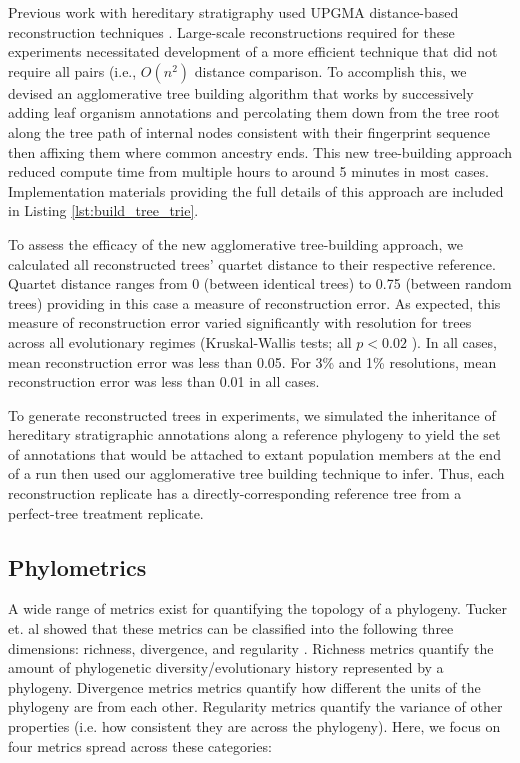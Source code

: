 Previous work with hereditary stratigraphy used UPGMA distance-based reconstruction techniques \citep{moreno2022hereditary}.
Large-scale reconstructions required for these experiments necessitated development of a more efficient technique that did not require all pairs (i.e., $O(n^2)$ distance comparison.
To accomplish this, we devised an agglomerative tree building algorithm that works by successively adding leaf organism annotations and percolating them down from the tree root along the tree path of internal nodes consistent with their fingerprint sequence then affixing them where common ancestry ends.
This new tree-building approach reduced compute time from multiple hours to around 5 minutes in most cases. 
Implementation materials providing the full details of this approach are included in Listing \ref{lst:build_tree_trie}.

To assess the efficacy of the new agglomerative tree-building approach, we calculated all reconstructed trees' quartet distance to  their respective reference.
Quartet distance ranges from 0 (between identical trees) to 0.75 (between random trees)
providing in this case a measure of reconstruction error.
As expected, this measure of reconstruction error varied significantly with resolution for trees across all evolutionary regimes (Kruskal-Wallis tests; all $p < 0.02$ ).
In all cases, mean reconstruction error was less than 0.05.
For 3\% and 1\% resolutions, mean reconstruction error was less than 0.01 in all cases.

To generate reconstructed trees in experiments, we simulated the inheritance of hereditary stratigraphic annotations along a reference phylogeny to yield the set of annotations that would be attached to extant population members at the end of a run then used our agglomerative tree building technique to infer. 
Thus, each reconstruction replicate has a directly-corresponding reference tree from a perfect-tree treatment replicate.

\subsection{Phylometrics}

A wide range of metrics exist for quantifying the topology of a phylogeny. Tucker et. al showed that these metrics can be classified into the following three dimensions: richness, divergence, and regularity \citep{tuckerGuidePhylogeneticMetrics2017}. 
Richness metrics quantify the amount of phylogenetic diversity/evolutionary history represented by a phylogeny. 
Divergence metrics metrics quantify how different the units of the phylogeny are from each other. 
Regularity metrics quantify the variance of other properties (i.e. how consistent they are across the phylogeny). 
Here, we focus on four metrics spread across these categories:

